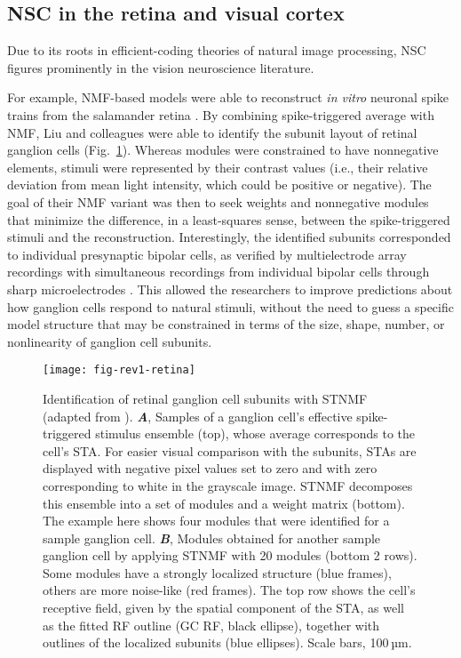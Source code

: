 \subsection*{NSC in the retina and visual cortex}

Due to its roots in efficient-coding theories of natural image processing,
\ac{NSC} figures prominently in the vision neuroscience literature.

For example, \ac{NMF}-based models were able to reconstruct
\emph{in vitro} neuronal spike trains from the salamander retina 
\cite{Onken2016,Liu2017}.
By combining spike-triggered average with \ac{NMF},
Liu and colleagues \cite{Liu2017} were able to identify the subunit layout
of retinal ganglion cells
(Fig.~\ref{fig:NMF|retina}).
Whereas modules were constrained to have nonnegative elements,
stimuli were represented by their contrast values (i.e., their relative deviation from mean light intensity, which could be positive or negative).
The goal of their \ac{NMF} variant was then to seek weights and nonnegative modules
that minimize the difference, in a least-squares sense, between the spike-triggered
stimuli and the reconstruction.
Interestingly, the identified subunits corresponded to 
individual presynaptic bipolar cells,
as verified by multielectrode array recordings with simultaneous recordings from
individual bipolar cells through sharp microelectrodes \cite{Liu2017}.
This allowed the researchers to improve predictions about how ganglion cells respond
to natural stimuli, without the need to guess a specific model structure that may be constrained in terms of the size, shape, number, or nonlinearity of 
ganglion cell subunits.

\begin{figure}[ht]
	\centering
	\texttt{[image: fig-rev1-retina]}
    \caption{
    Identification of retinal ganglion cell subunits 
    with \ac{STNMF} (adapted from \cite{Liu2017}).
    \textbf{\emph{A}},
	     Samples of a ganglion cell’s effective spike-triggered stimulus ensemble (top),
         whose average corresponds to the cell’s \ac{STA}.
         For easier visual comparison with the subunits,
         \acp{STA} are displayed with negative pixel values set to zero and
         with zero corresponding to white in the grayscale image.
         \ac{STNMF} decomposes this ensemble into a set of modules and 
         a weight matrix (bottom).
         The example here shows four modules that were identified for
         a sample ganglion cell.
    \textbf{\emph{B}},
         Modules obtained for another sample ganglion cell by applying \ac{STNMF}
         with 20 modules (bottom 2 rows). Some modules have a strongly localized structure 
         (blue frames), others are more noise-like (red frames).
         The top row shows the cell’s receptive field,
         given by the spatial component of the STA, as well as the fitted \ac{RF} outline
         (GC RF, black ellipse), together with outlines of the localized subunits 
         (blue ellipses). Scale bars, 100 µm.
    }
	\label{fig:NMF|retina}
\end{figure}

